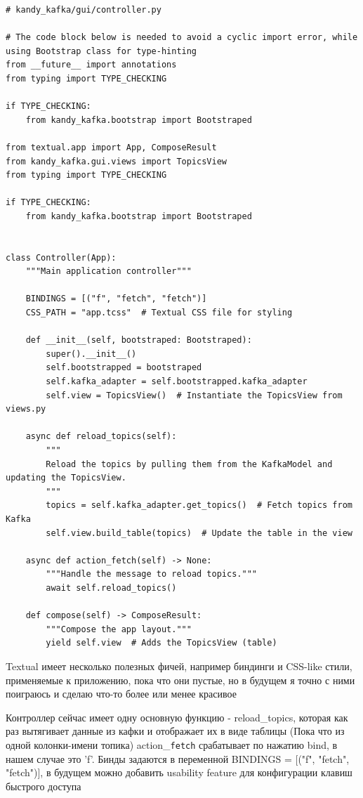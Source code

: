 \documentclass[10pt , a4paper]{report}
\newenvironment{code}{\captionsetup{type=listing}}{}
\begin{document}
\begin{code}
  \begin{verbatim}
# kandy_kafka/gui/controller.py

# The code block below is needed to avoid a cyclic import error, while using Bootstrap class for type-hinting
from __future__ import annotations
from typing import TYPE_CHECKING

if TYPE_CHECKING:
    from kandy_kafka.bootstrap import Bootstraped

from textual.app import App, ComposeResult
from kandy_kafka.gui.views import TopicsView
from typing import TYPE_CHECKING

if TYPE_CHECKING:
    from kandy_kafka.bootstrap import Bootstraped


class Controller(App):
    """Main application controller"""

    BINDINGS = [("f", "fetch", "fetch")]
    CSS_PATH = "app.tcss"  # Textual CSS file for styling

    def __init__(self, bootstraped: Bootstraped):
        super().__init__()
        self.bootstrapped = bootstraped
        self.kafka_adapter = self.bootstrapped.kafka_adapter
        self.view = TopicsView()  # Instantiate the TopicsView from views.py

    async def reload_topics(self):
        """
        Reload the topics by pulling them from the KafkaModel and updating the TopicsView.
        """
        topics = self.kafka_adapter.get_topics()  # Fetch topics from Kafka
        self.view.build_table(topics)  # Update the table in the view

    async def action_fetch(self) -> None:
        """Handle the message to reload topics."""
        await self.reload_topics()

    def compose(self) -> ComposeResult:
        """Compose the app layout."""
        yield self.view  # Adds the TopicsView (table)

  \end{verbatim}
\end{code}

Textual имеет несколько полезных фичей, например биндинги и CSS-like стили, применяемые к приложению, пока что они пустые, но в будущем я точно с ними поиграюсь и сделаю что-то более или менее красивое 

Контроллер сейчас имеет одну основную функцию - reload\_topics, которая как раз вытягивает данные из кафки и отображает их в виде таблицы (Пока что из одной колонки-имени топика) action\_\texttt{fetch} срабатывает по нажатию bind, в нашем случае это 'f'. Бинды задаются в переменной BINDINGS = [("f", "fetch", "fetch")], в будущем можно добавить usability feature для конфигурации клавиш быстрого доступа 
\end{document}
